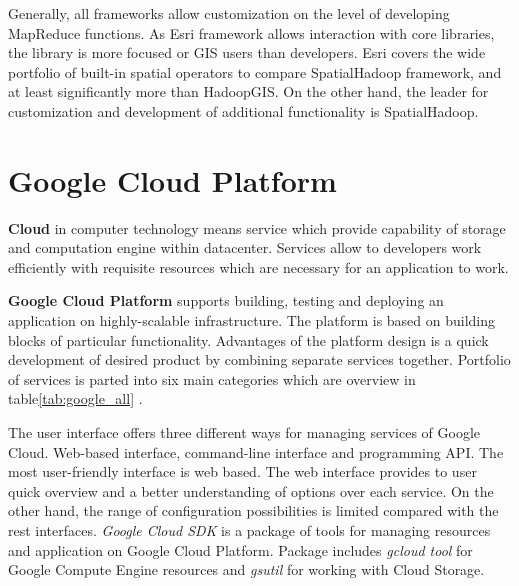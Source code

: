 \documentclass[a4paper,12pt,oneside]{report}
\begin{document}
Generally, all frameworks allow customization on the level of developing MapReduce functions. As Esri 
framework allows interaction with core libraries, the library is more focused or GIS users than developers. 
Esri covers the wide portfolio of built-in spatial operators to compare SpatialHadoop framework, 
and at least significantly more than HadoopGIS. On the other hand, the leader for customization and 
development of additional functionality is SpatialHadoop.



		
	\section{Google Cloud Platform}
\textbf{Cloud} in computer technology means service which provide capability of storage and computation engine within datacenter. Services allow to developers  work efficiently  with 
requisite resources which are necessary for an application to work.

\textbf{Google Cloud Platform} supports building, testing and deploying an application on highly-scalable infrastructure.
The platform is based on building blocks of particular functionality. Advantages of  the platform design is a quick development of 
desired product by combining separate services together. Portfolio of services is parted into six main categories 
which are overview  in
table\ref{tab:google_all} \cite{gc_product_services}.

The user interface offers three different ways for managing services of Google Cloud. Web-based interface, command-line 
interface and programming API. The most user-friendly interface is web based. The web interface provides to 
user quick overview and a better understanding of 
options over each service. On the other hand, the range of configuration possibilities is limited compared with the rest 
interfaces. \textit{Google Cloud SDK} is a 
package of tools for managing resources and application on Google Cloud Platform. 
Package includes \textit{gcloud tool} for Google Compute Engine resources and \textit{gsutil} for working with Cloud Storage.
\end{document}

